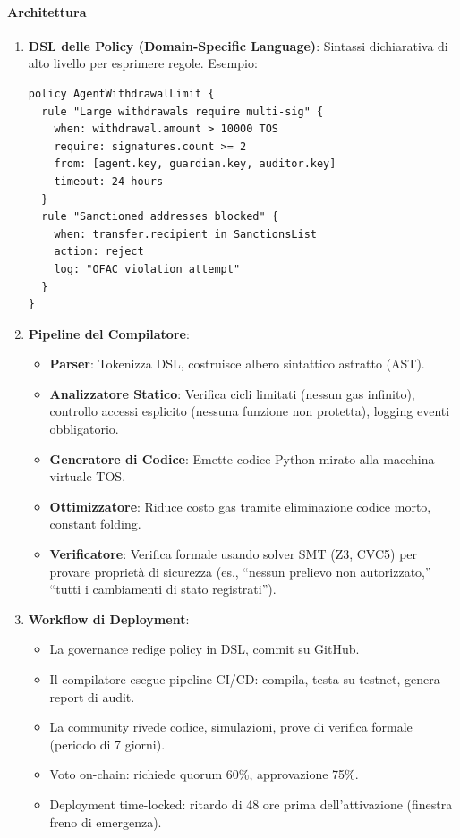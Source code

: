 \documentclass[11pt]{article}
\begin{document}
\paragraph{Architettura}
\begin{enumerate}[noitemsep]
  \item \textbf{DSL delle Policy (Domain-Specific Language)}: Sintassi dichiarativa di alto livello per esprimere regole. Esempio:
  \begin{verbatim}
policy AgentWithdrawalLimit {
  rule "Large withdrawals require multi-sig" {
    when: withdrawal.amount > 10000 TOS
    require: signatures.count >= 2
    from: [agent.key, guardian.key, auditor.key]
    timeout: 24 hours
  }
  rule "Sanctioned addresses blocked" {
    when: transfer.recipient in SanctionsList
    action: reject
    log: "OFAC violation attempt"
  }
}
  \end{verbatim}
  \item \textbf{Pipeline del Compilatore}:
    \begin{itemize}[noitemsep]
      \item \textbf{Parser}: Tokenizza DSL, costruisce albero sintattico astratto (AST).
      \item \textbf{Analizzatore Statico}: Verifica cicli limitati (nessun gas infinito), controllo accessi esplicito (nessuna funzione non protetta), logging eventi obbligatorio.
      \item \textbf{Generatore di Codice}: Emette codice Python mirato alla macchina virtuale TOS.
      \item \textbf{Ottimizzatore}: Riduce costo gas tramite eliminazione codice morto, constant folding.
      \item \textbf{Verificatore}: Verifica formale usando solver SMT (Z3, CVC5) per provare proprietà di sicurezza (es., ``nessun prelievo non autorizzato,'' ``tutti i cambiamenti di stato registrati'').
    \end{itemize}
  \item \textbf{Workflow di Deployment}:
    \begin{itemize}[noitemsep]
      \item La governance redige policy in DSL, commit su GitHub.
      \item Il compilatore esegue pipeline CI/CD: compila, testa su testnet, genera report di audit.
      \item La community rivede codice, simulazioni, prove di verifica formale (periodo di 7 giorni).
      \item Voto on-chain: richiede quorum 60\%, approvazione 75\%.
      \item Deployment time-locked: ritardo di 48 ore prima dell'attivazione (finestra freno di emergenza).
    \end{itemize}
\end{enumerate}
\end{document}
